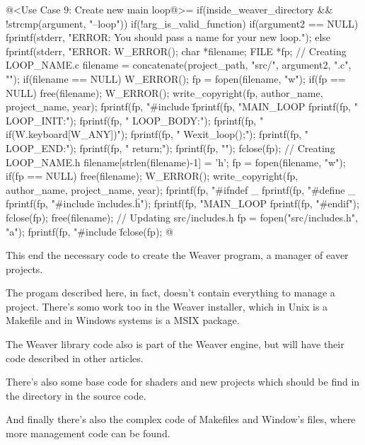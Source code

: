 {\iniciocodigo
@<Use Case 9: Create new main loop@>=
if(inside_weaver_directory && !strcmp(argument, "--loop")){
  if(!arg_is_valid_function){
    if(argument2 == NULL)
      fprintf(stderr,
              "ERROR: You should pass a name for your new loop.\n");
    else
      fprintf(stderr, "ERROR: %
    W_ERROR();
  }
  char *filename;
  FILE *fp;
  // Creating LOOP_NAME.c
  filename = concatenate(project_path, "src/", argument2, ".c", "");
  if(filename == NULL) W_ERROR();
  fp = fopen(filename, "w");
  if(fp == NULL){
    free(filename);
    W_ERROR();
  }
  write_copyright(fp, author_name, project_name, year);
  fprintf(fp, "#include \"%
  fprintf(fp, "MAIN_LOOP %
  fprintf(fp, " LOOP_INIT:\n\n");
  fprintf(fp, " LOOP_BODY:\n");
  fprintf(fp, "  if(W.keyboard[W_ANY])\n");
  fprintf(fp, "    Wexit_loop();\n");
  fprintf(fp, " LOOP_END:\n");
  fprintf(fp, "  return;\n");
  fprintf(fp, "}\n");
  fclose(fp);
  // Creating LOOP_NAME.h
  filename[strlen(filename)-1] = 'h';
  fp = fopen(filename, "w");
  if(fp == NULL){
    free(filename);
    W_ERROR();
  }
  write_copyright(fp, author_name, project_name, year);
  fprintf(fp, "#ifndef _%
  fprintf(fp, "#define _%
  fprintf(fp, "#include \"includes.h\"\n\n");
  fprintf(fp, "MAIN_LOOP %
  fprintf(fp, "#endif\n");
  fclose(fp);
  free(filename);
  // Updating src/includes.h
  fp = fopen("src/includes.h", "a");
  fprintf(fp, "#include \"%
  fclose(fp);  
}
@
\fimcodigo


This end the necessary code to create the Weaver program, a manager of
eaver projects.

The progam described here, in fact, doesn't contain everything to
manage a project. There's somo work too in the Weaver installer, which
in Unix is a Makefile and in Windows systems is a MSIX package.

The Weaver library code also is part of the Weaver engine, but will
have their code described in other articles.

There's also some base code for shaders and new projects which should
be find in the directory  in the source code.

And finally there's also the complex code of Makefiles and Window's
 files, where more management code can be found.

\fim
